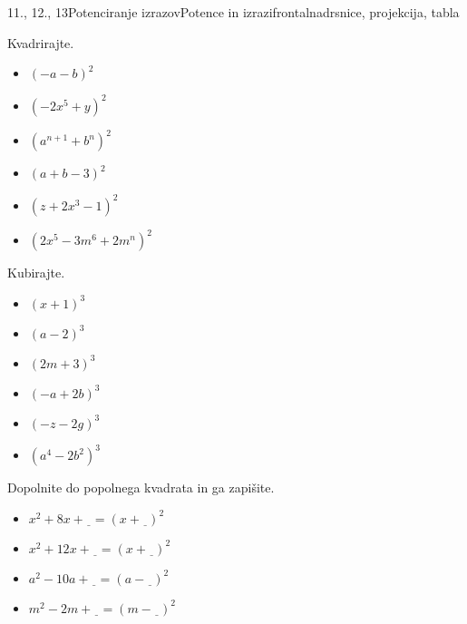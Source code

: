 \begin{priprava}{11., 12., 13}{}{Potenciranje izrazov}{Potence in izrazi}{frontalna}{drsnice, projekcija, tabla}
\begin{multicols}{2}
                \begin{naloga}
                    Kvadrirajte.
                    \begin{itemize}
                        \item $(-a-b)^2$ 
                        \item $(-2x^5+y)^2$ 
                        \item $(a^{n+1}+b^n)^2$ 
                        \item $(a+b-3)^2$ 
                        \item $(z+2x^3-1)^2$ 
                        \item $(2x^5-3m^6+2m^n)^2$ 
                    \end{itemize}
                \end{naloga}


                \begin{naloga}
                    Kubirajte.
                    \begin{itemize}
                        \item $(x+1)^3$ 
                        \item $(a-2)^3$ 
                        \item $(2m+3)^3$ 
                        \item $(-a+2b)^3$ 
                        \item $(-z-2g)^3$ 
                        \item $(a^4-2b^2)^3$ 
                    \end{itemize}
                \end{naloga}


                \begin{naloga}
                    Dopolnite do popolnega kvadrata in ga zapišite.
                    \begin{itemize}
                        \item $x^2+8x+\underline{\ \ }=(x+\underline{\ \ })^2$ 
                        \item $x^2+12x+\underline{\ \ }=(x+\underline{\ \ })^2$ 
                        \item $a^2-10a+\underline{\ \ }=(a-\underline{\ \ })^2$ 
                        \item $m^2-2m+\underline{\ \ }=(m-\underline{\ \ })^2$ 
                    \end{itemize}
                \end{naloga}


\end{multicols}
\end{priprava}
